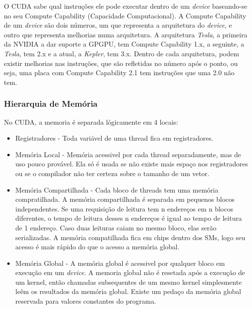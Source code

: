 O CUDA sabe qual instruções ele pode executar dentro de um \textit{device} baseando-se no seu Compute Capability 
(Capacidade Computacional). A Compute Capability de um \textit{device} são dois números, um que representa a arquitetura do 
\textit{device}, e outro que representa melhorias numa arquitetura.
A arquitetura \textit{Tesla}, a primeira da NVIDIA a dar suporte a GPGPU, tem Compute Capability 1.x, a seguinte, a \textit{Tesla},
tem 2.x e a atual, a \textit{Kepler}, tem 3.x. Dentro de cada arquitetura, podem existir melhorias nas instruções, que são
refletidas no número após o ponto, ou seja, uma placa com Compute Capability 2.1 tem instruções que uma 2.0 não tem.

\subsubsection{Hierarquia de Memória}
No CUDA, a memoria é separada lógicamente em 4 locais:

\begin{itemize}
  \item Registradores - Toda variável de uma thread fica em registradores.
  \item Memória Local - Memória acessivel por cada thread separadamente, mas de uso pouco provável. Ela só é usada se
          não existe mais espaço nos registradores ou se o compilador não ter certeza sobre o tamanho de um vetor.
  \item Memória Compartilhada - Cada bloco de threads tem uma memória compratilhada. A memória compartilhada é separada em
          pequenos blocos independentes. Se uma requisição de leitura tem n endereços em n blocos diferentes, o tempo de leitura
          desses n endereços é igual ao tempo de leitura de 1 endereço. Caso duas leituras caiam no mesmo bloco, elas serão
          serializadas. A memória compatilhada fica em chips dentro dos SMs, logo seu acesso é mais rápido do que o acesso a
          memória global.
  \item Memória Global - A memória global é acessivel por qualquer bloco em execução em um \textit{device}. A memoria global não é
          resetada após a execução de um kernel, então chamadas subsequentes de um mesmo kernel simplesmente leêm os resultados
          da memória global. Existe um pedaço da memória global reservada para valores constantes do programa.
\end{itemize}

